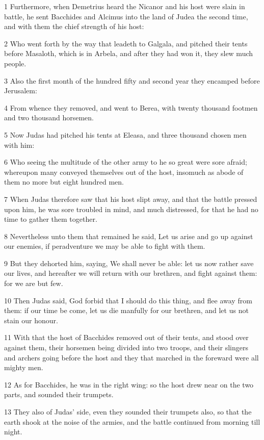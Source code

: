 \par 1 Furthermore, when Demetrius heard the Nicanor and his host were slain in battle, he sent Bacchides and Alcimus into the land of Judea the second time, and with them the chief strength of his host:
\par 2 Who went forth by the way that leadeth to Galgala, and pitched their tents before Masaloth, which is in Arbela, and after they had won it, they slew much people.
\par 3 Also the first month of the hundred fifty and second year they encamped before Jerusalem:
\par 4 From whence they removed, and went to Berea, with twenty thousand footmen and two thousand horsemen.
\par 5 Now Judas had pitched his tents at Eleasa, and three thousand chosen men with him:
\par 6 Who seeing the multitude of the other army to he so great were sore afraid; whereupon many conveyed themselves out of the host, insomuch as abode of them no more but eight hundred men.
\par 7 When Judas therefore saw that his host slipt away, and that the battle pressed upon him, he was sore troubled in mind, and much distressed, for that he had no time to gather them together.
\par 8 Nevertheless unto them that remained he said, Let us arise and go up against our enemies, if peradventure we may be able to fight with them.
\par 9 But they dehorted him, saying, We shall never be able: let us now rather save our lives, and hereafter we will return with our brethren, and fight against them: for we are but few.
\par 10 Then Judas said, God forbid that I should do this thing, and flee away from them: if our time be come, let us die manfully for our brethren, and let us not stain our honour.
\par 11 With that the host of Bacchides removed out of their tents, and stood over against them, their horsemen being divided into two troops, and their slingers and archers going before the host and they that marched in the foreward were all mighty men.
\par 12 As for Bacchides, he was in the right wing: so the host drew near on the two parts, and sounded their trumpets.
\par 13 They also of Judas' side, even they sounded their trumpets also, so that the earth shook at the noise of the armies, and the battle continued from morning till night.
